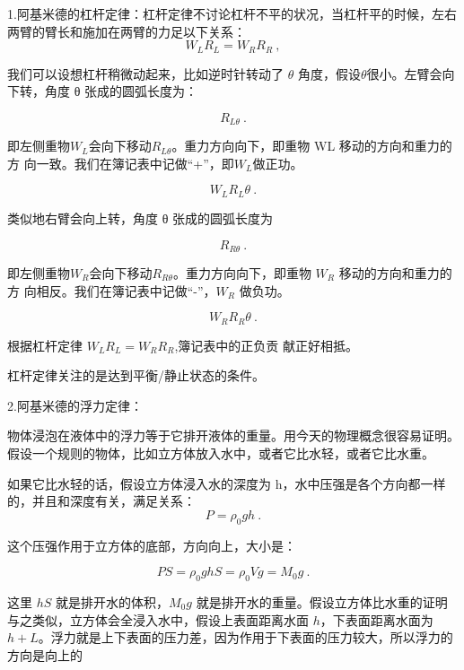 1.阿基米德的杠杆定律：杠杆定律不讨论杠杆不平的状况，当杠杆平的时候，左右两臂的臂长和施加在两臂的力足以下关系：
\begin{equation}
W_L R_L = W_R R_R~,
\end{equation}

我们可以设想杠杆稍微动起来，比如逆时针转动了 $\theta$ 角度，假设$\theta$很小。左臂会向下转，角度 θ 张成的圆弧长度为：

\begin{equation}
R_{L\theta}~.
\end{equation}

即左侧重物$W_L$会向下移动$R_{L\theta}$。重⼒⽅向向下，即重物 WL 移动的⽅向和重⼒的⽅
向⼀致。我们在簿记表中记做“+”，即$W_L$做正功。

\begin{equation}
W_L R_L \theta~.
\end{equation}

类似地右臂会向上转，角度 θ 张成的圆弧长度为

\begin{equation}
R_{R\theta}~.
\end{equation}

即左侧重物$W_R$会向下移动$R_{R\theta}$。重⼒⽅向向下，即重物 $W_R$ 移动的⽅向和重⼒的⽅
向相反。我们在簿记表中记做“-”，$W_R$ 做负功。

\begin{equation}
W_R R_R \theta~.
\end{equation}

根据杠杆定律 $W_L R_L=W_R R_R$,簿记表中的正负贡
献正好相抵。

杠杆定律关注的是达到平衡/静⽌状态的条件。


2.阿基米德的浮⼒定律：

物体浸泡在液体中的浮⼒等于它排开液体的重量。用今天的物理概念很容易证明。假设⼀个规则的物体，比如立⽅体放⼊⽔中，或者它比⽔轻，或者它比⽔重。

如果它比⽔轻的话，假设立⽅体浸⼊⽔的深度为 h，⽔中压强是各个⽅向都⼀样的，并且和深度有关，满⾜关系：
\begin{equation}
P = \rho_0 gh~.
\end{equation}

这个压强作用于立方体的底部，方向向上，大小是：

\begin{equation}
PS = \rho_0 gh S = \rho_0 V g = M_0 g~.
\end{equation}

这里 $hS$ 就是排开⽔的体积，$M_0g$ 就是排开⽔的重量。假设立⽅体比⽔重的证明与之类似，立⽅体会全浸⼊⽔中，假设上表面距离⽔面 $h$，下表面距离⽔面为 $h + L$。浮⼒就是上下表面的压⼒差，因为作用于下表面的压⼒较⼤，所以浮⼒的⽅向是向上的


